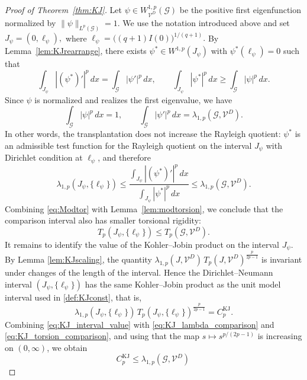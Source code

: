 \documentclass[12pt,a4paper]{article}
\numberwithin{equation}{section}
\newcommand{\WpD}{W^{1,p}_{\mathcal{V}^D}(\mathcal G)}
\begin{document}
\begin{proof}[Proof of Theorem~\ref{thm:KJ}]
		Let $\psi\in\WpD$ be the positive first eigenfunction normalized by
		\(
		\|\psi\|_{L^p(\mathcal G)}=1.
		\)
		We use the notation introduced above and set
		\(
		J_\psi=(0,\ell_\psi),\) where \(
		\ell_\psi=\bigl((q+1)I(0)\bigr)^{1/(q+1)}.
		\)
		By Lemma~\ref{lem:KJrearrange}, there exists
		$\psi^*\in W^{1,p}(J_\psi)$ with $\psi^*(\ell_\psi)=0$ such that
		\[
		\int_{J_\psi}|(\psi^*)'|^p\,dx
		=
		\int_{\mathcal G}|\psi'|^p\,dx,
		\qquad
		\int_{J_\psi}|\psi^*|^p\,dx
		\ge
		\int_{\mathcal G}|\psi|^p\,dx.
		\]
		Since $\psi$ is normalized and realizes the first eigenvalue, we have
		\[
		\int_{\mathcal G}|\psi|^p\,dx=1,
		\qquad
		\int_{\mathcal G}|\psi'|^p\,dx
		=
		\lambda_{1,p}(\mathcal G,\mathcal V^D).
		\]
		In other words, the transplantation does not increase the Rayleigh
		quotient: $\psi^*$ is an admissible test function for the Rayleigh
		quotient on the interval $J_\psi$ with Dirichlet condition at
		$\ell_\psi$, and therefore
		\begin{equation}
			\label{eq:KJ_lambda_comparison}
			\lambda_{1,p}(J_\psi,\{\ell_\psi\})
			\le
			\frac{\int_{J_\psi}|(\psi^*)'|^p\,dx}
			{\int_{J_\psi}|\psi^*|^p\,dx}
			\le
			\lambda_{1,p}(\mathcal G,\mathcal V^D).
		\end{equation}
		Combining \eqref{eq:Modtor} with Lemma~\ref{lem:modtorsion}, we conclude
		that the comparison interval also has smaller torsional rigidity:
		\begin{equation}
			\label{eq:KJ_torsion_comparison}
			T_p(J_\psi,\{\ell_\psi\})
			\le
			T_p(\mathcal G,\mathcal V^D).
		\end{equation}
		It remains to identify the value of the Kohler--Jobin product on the
		interval $J_\psi$. By Lemma \ref{lem:KJscaling}, the
		quantity
		\(
		\lambda_{1,p}(J,\mathcal V^D)\,
		T_p(J,\mathcal V^D)^{\frac{p}{2p-1}}
		\)
		is invariant under changes of the length of the interval. Hence the
		Dirichlet--Neumann interval $(J_\psi,\{\ell_\psi\})$ has the same
		Kohler--Jobin product as the unit model interval used in
		\eqref{def:KJconst}, that is,
		\begin{equation}
			\label{eq:KJ_interval_value}
			\lambda_{1,p}(J_\psi,\{\ell_\psi\})\,
			T_p(J_\psi,\{\ell_\psi\})^{\frac{p}{2p-1}}
			=
			C_p^{\mathrm{KJ}}.
		\end{equation}
		Combining \eqref{eq:KJ_interval_value} with
		\eqref{eq:KJ_lambda_comparison} and \eqref{eq:KJ_torsion_comparison},
		and using that the map $s\mapsto s^{p/(2p-1)}$ is increasing on
		$(0,\infty)$, we obtain
		\[
		C_p^{\mathrm{KJ}}
		\le
		\lambda_{1,p}(\mathcal G,\mathcal V^D)\,
\]
\end{proof}
\end{document}
